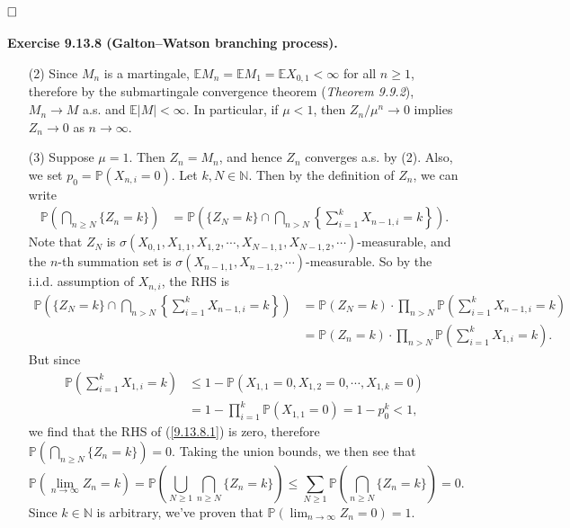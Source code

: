 \documentclass[12pt]{extarticle}
\begin{document}
$\hspace{\fill}\square$
\\
\\
\textbf{Exercise 9.13.8 (Galton–Watson branching process).}
\begin{enumerate}
\item[(2)] Since $M_n$ is a martingale, $\mathbb{E}M_n=\mathbb{E}M_1=\mathbb{E}X_{0,1}<\infty$ for all $n\geq 1$, therefore by the submartingale convergence theorem (\textit{Theorem 9.9.2}), $M_n\rightarrow M$ a.s. and $\mathbb{E}|M|<\infty$. In particular, if $\mu<1$, then $Z_n/\mu^n\rightarrow 0$ implies $Z_n\rightarrow 0$ as $n\rightarrow\infty$.

\item[(3)] Suppose $\mu=1$. Then $Z_n=M_n$, and hence $Z_n$ converges a.s. by (2).
Also, we set $p_0=\mathbb{P}(X_{n,i}=0)$.
Let $k,N\in\mathbb{N}$. Then by the definition of $Z_n$, we can write
\begin{equation}
\begin{aligned}
\mathbb{P}\left(\bigcap_{n\geq N}\{Z_n=k\}\right)
&=
\mathbb{P}\left(\{Z_N=k\}\cap\bigcap_{n>N}\left\{\sum_{i=1}^k X_{n-1,i}=k\right\}\right).
\end{aligned}
\label{9.13.8.1}
\end{equation}
Note that $Z_N$ is $\sigma(X_{0,1},X_{1,1},X_{1,2},\cdots,X_{N-1,1},X_{N-1,2},\cdots)$-measurable, and the $n$-th summation set is $\sigma(X_{n-1,1},X_{n-1,2},\cdots)$-measurable. So by the i.i.d. assumption of $X_{n,i}$, the RHS is
\[
\begin{aligned}
\mathbb{P}\left(\{Z_N=k\}\cap\bigcap_{n>N}\left\{\sum_{i=1}^k X_{n-1,i}=k\right\}\right)
&=
\mathbb{P}(Z_N=k)
\cdot
\prod_{n>N}\mathbb{P}\left(\sum_{i=1}^k X_{n-1,i}=k\right)
\\&=
\mathbb{P}(Z_n=k)\cdot\prod_{n>N}\mathbb{P}\left(\sum_{i=1}^k X_{1,i}=k\right).
\end{aligned}
\]
But since
\[
\begin{aligned}
\mathbb{P}\left(\sum_{i=1}^k X_{1,i}=k\right)
&\leq
1-\mathbb{P}(X_{1,1}=0,X_{1,2}=0,\cdots,X_{1,k}=0)
\\&=
1-\prod_{i=1}^k\mathbb{P}(X_{1,1}=0)=1-p_0^k<1,
\end{aligned}
\]
we find that the RHS of (\ref{9.13.8.1}) is zero, therefore $\mathbb{P}\left(\bigcap_{n\geq N}\{Z_n=k\}\right)=0$. Taking the union bounds, we then see that
\[
\mathbb{P}\left(\lim_{n\rightarrow\infty}Z_n=k\right)
=
\mathbb{P}\left(\bigcup_{N\geq 1}\bigcap_{n\geq N}\{Z_n=k\}\right)
\leq
\sum_{N\geq 1}\mathbb{P}\left(\bigcap_{n\geq N}\{Z_n=k\}\right)=0.
\]
Since $k\in\mathbb{N}$ is arbitrary, we've proven that $\mathbb{P}\left(\lim_{n\rightarrow\infty}Z_n=0\right)=1$.


\end{enumerate}
\end{document}
